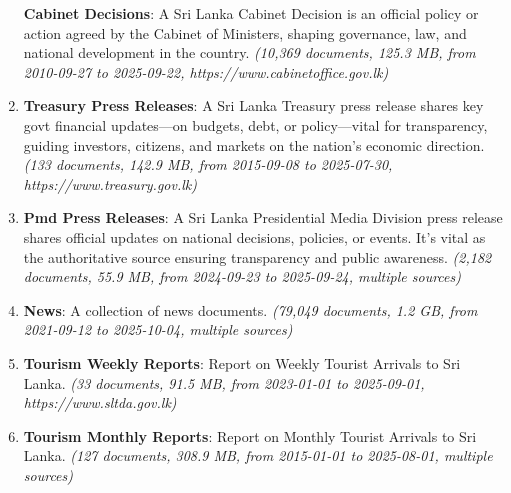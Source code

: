 \documentclass[10pt,a4paper,twocolumn]{article}%
\begin{document}
\begin{enumerate}
\textbf{Cabinet Decisions}: A Sri Lanka Cabinet Decision is an official policy or action agreed by the Cabinet of Ministers, shaping governance, law, and national development in the country.\textit{ (10,369 documents, 125.3 MB, from 2010{-}09{-}27 to 2025{-}09{-}22, https://www.cabinetoffice.gov.lk)}%
\item%
\textbf{Treasury Press Releases}: A Sri Lanka Treasury press release shares key govt financial updates—on budgets, debt, or policy—vital for transparency, guiding investors, citizens, and markets on the nation’s economic direction.\textit{ (133 documents, 142.9 MB, from 2015{-}09{-}08 to 2025{-}07{-}30, https://www.treasury.gov.lk)}%
\item%
\textbf{Pmd Press Releases}: A Sri Lanka Presidential Media Division press release shares official updates on national decisions, policies, or events. It’s vital as the authoritative source ensuring transparency and public awareness.\textit{ (2,182 documents, 55.9 MB, from 2024{-}09{-}23 to 2025{-}09{-}24, multiple sources)}%
\item%
\textbf{News}: A collection of news documents.\textit{ (79,049 documents, 1.2 GB, from 2021{-}09{-}12 to 2025{-}10{-}04, multiple sources)}%
\item%
\textbf{Tourism Weekly Reports}: Report on Weekly Tourist Arrivals to Sri Lanka.\textit{ (33 documents, 91.5 MB, from 2023{-}01{-}01 to 2025{-}09{-}01, https://www.sltda.gov.lk)}%
\item%
\textbf{Tourism Monthly Reports}: Report on Monthly Tourist Arrivals to Sri Lanka.\textit{ (127 documents, 308.9 MB, from 2015{-}01{-}01 to 2025{-}08{-}01, multiple sources)}%
\end{enumerate}

%
\end{document}
